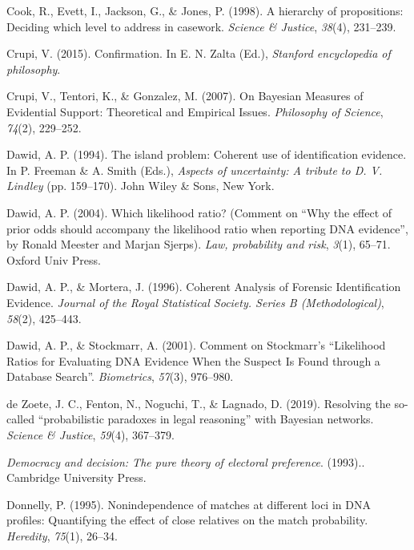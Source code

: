 \documentclass[10pt,dvipsnames,enabledeprecatedfontcommands]{scrartcl}
\begin{document}
\hypertarget{ref-Cook1998hierarchy}{}
Cook, R., Evett, I., Jackson, G., \& Jones, P. (1998). A hierarchy of
propositions: Deciding which level to address in casework. \emph{Science
\& Justice}, \emph{38}(4), 231--239.

\hypertarget{ref-crupi2015confirmation}{}
Crupi, V. (2015). Confirmation. In E. N. Zalta (Ed.), \emph{Stanford
encyclopedia of philosophy}.

\hypertarget{ref-crupi2007BayesianMeasuresEvidential}{}
Crupi, V., Tentori, K., \& Gonzalez, M. (2007). On Bayesian Measures of
Evidential Support: Theoretical and Empirical Issues. \emph{Philosophy
of Science}, \emph{74}(2), 229--252.

\hypertarget{ref-dawid1994island}{}
Dawid, A. P. (1994). The island problem: Coherent use of identification
evidence. In P. Freeman \& A. Smith (Eds.), \emph{Aspects of
uncertainty: A tribute to D. V. Lindley} (pp. 159--170). John Wiley \&
Sons, New York.

\hypertarget{ref-dawid2004likelihood}{}
Dawid, A. P. (2004). Which likelihood ratio? (Comment on ``Why the
effect of prior odds should accompany the likelihood ratio when
reporting DNA evidence'', by Ronald Meester and Marjan Sjerps).
\emph{Law, probability and risk}, \emph{3}(1), 65--71. Oxford Univ
Press.

\hypertarget{ref-dawid1996CoherentAnalysisForensic}{}
Dawid, A. P., \& Mortera, J. (1996). Coherent Analysis of Forensic
Identification Evidence. \emph{Journal of the Royal Statistical Society.
Series B (Methodological)}, \emph{58}(2), 425--443.

\hypertarget{ref-dawid2001CommentStockmarrLikelihood}{}
Dawid, A. P., \& Stockmarr, A. (2001). Comment on Stockmarr's
``Likelihood Ratios for Evaluating DNA Evidence When the Suspect Is
Found through a Database Search''. \emph{Biometrics}, \emph{57}(3),
976--980.

\hypertarget{ref-dezoete2019ResolvingSocalledProbabilistic}{}
de Zoete, J. C., Fenton, N., Noguchi, T., \& Lagnado, D. (2019).
Resolving the so-called ``probabilistic paradoxes in legal reasoning''
with Bayesian networks. \emph{Science \& Justice}, \emph{59}(4),
367--379.

\hypertarget{ref-brennan_lomasky_1993}{}
\emph{Democracy and decision: The pure theory of electoral preference}.
(1993).. Cambridge University Press.

\hypertarget{ref-donnelly1995NonindependenceMatchesDifferent}{}
Donnelly, P. (1995). Nonindependence of matches at different loci in DNA
profiles: Quantifying the effect of close relatives on the match
probability. \emph{Heredity}, \emph{75}(1), 26--34.
\end{document}
